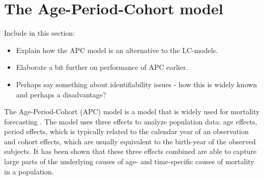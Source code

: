 \section{The Age-Period-Cohort model}
\label{sec:APC-model}
\textcolor{myDarkGreen}{
Include in this section:
\begin{itemize}
    \item Explain how the APC model is an alternative to the LC-models.
    \item Elaborate a bit further on performance of APC earlier. 
    \item Perhaps say something about identifiability issues - how this is widely known and perhaps a disadvantage?
\end{itemize}
}
The Age-Period-Cohort (APC) model is a model that is widely used for mortality forecasting \cite{rieblerHeld2010}. The model uses three effects to analyze population data; age effects, period effects, which is typically related to the calendar year of an observation and cohort effects, which are usually equivalent to the birth-year of the observed subjects. It has been shown that these three effects combined are able to capture large parts of the underlying causes of age- and time-specific causes of mortality in a population. 

